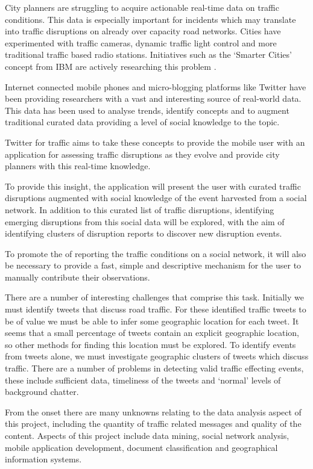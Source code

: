 City planners are struggling to acquire actionable real-time data on traffic
conditions. This data is especially important for incidents which may translate
into traffic disruptions on already over capacity road networks. Cities have
experimented with traffic cameras, dynamic traffic light control and more
traditional traffic based radio stations. Initiatives such as the `Smarter
Cities’ concept from IBM are actively researching this problem
\cite{website:smarter_cities}.

Internet connected mobile phones and micro-blogging platforms like Twitter have
been providing researchers with a vast and interesting source of real-world
data. This data has been used to analyse trends, identify concepts and to
augment traditional curated data providing a level of social knowledge to the
topic.

Twitter for traffic aims to take these concepts to provide the mobile user with
an application for assessing traffic disruptions as they evolve and provide
city planners with this real-time knowledge.

To provide this insight, the application will present the user with curated
traffic disruptions augmented with social knowledge of the event harvested from
a social network.  In addition to this curated list of traffic disruptions,
identifying emerging disruptions from this social data will be explored, with
the aim of identifying clusters of disruption reports to discover new
disruption events.

To promote the of reporting the traffic conditions on a social network, it will
also be necessary to provide a fast, simple and descriptive mechanism for the
user to manually contribute their observations.

There are a number of interesting challenges that comprise this task. Initially
we must identify tweets that discuss road traffic. For these identified traffic
tweets to be of value we must be able to infer some geographic location for
each tweet. It seems that a small percentage of tweets contain an explicit
geographic location, so other methods for finding this location must be
explored. To identify events from tweets alone, we must investigate geographic
clusters of tweets which discuss traffic. There are a number of problems in
detecting valid traffic effecting events, these include sufficient data,
timeliness of the tweets and  ‘normal’ levels of background chatter.

From the onset there are many unknowns relating to the data analysis aspect of
this project, including the quantity of traffic related messages and quality of
the content. Aspects of this project include data mining, social network
analysis, mobile application development, document classification and
geographical information systems.
